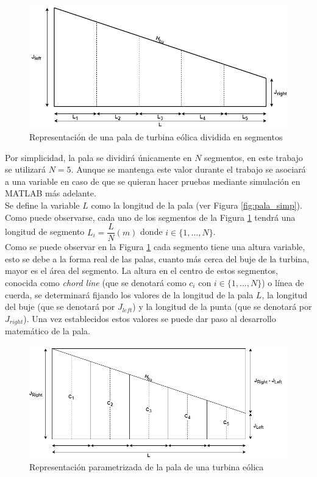 \begin{figure}[H]
    \centering
    \includegraphics[width=1\textwidth]{images/pala simple segmentada.png}
    \caption{Representación de una pala de turbina eólica dividida en segmentos}
    \label{fig:pala_dividida}
\end{figure}

Por simplicidad, la pala se dividirá únicamente en $N$ segmentos, en este trabajo se utilizará $N=5$. Aunque se mantenga este valor durante el trabajo se asociará a una variable en caso de que se quieran hacer pruebas mediante simulación en MATLAB más adelante. \\
    

Se define la variable $L$ como la longitud de la pala (ver Figura \ref{fig:pala_simp}). Como puede observarse, cada uno de los segmentos de la Figura \ref{fig:pala_dividida} tendrá una longitud de segmento $L_i = \dfrac{L}{N} (m)$ donde $i \in \{1,...,N\}$.\\

Como se puede observar en la Figura \ref{fig:pala_dividida} cada segmento tiene una altura variable, esto se debe a la forma real de las palas, cuanto más cerca del buje de la turbina, mayor es el área del segmento. La altura en el centro de estos segmentos, conocida como \textit{chord line} (que se denotará como $c_i$ con $i \in \{1, ...,N\}$) o línea de cuerda, se determinará fijando los valores de la longitud de la pala $L$, la longitud del buje (que se denotará por $J_{left}$) y la longitud de la punta (que se denotará por $J_{right}$). Una vez establecidos estos valores se puede dar paso al desarrollo matemático de la pala.\\

\begin{figure}[H]
    \centering
    \includegraphics[width=1\textwidth]{images/planteo chord line.drawio.png}
    \caption{Representación parametrizada de la pala de una turbina eólica}
    
    \label{fig:pala_desarrollo_chord}
\end{figure}

